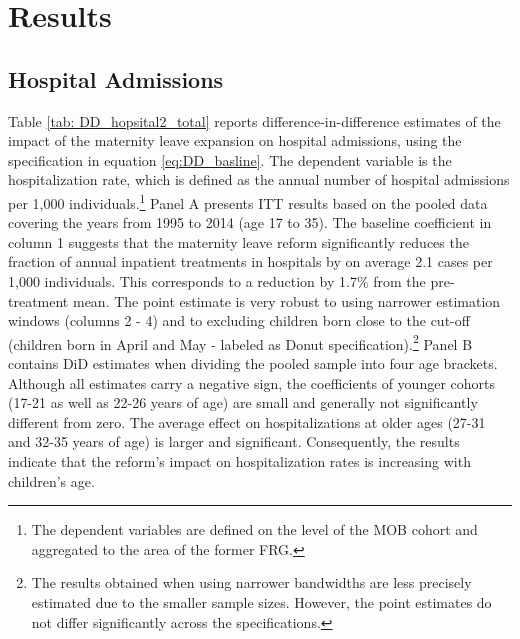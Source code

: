 \documentclass[11pt, a4paper,draft]{article} %
\begin{document}














\section{Results}\label{sec:results}

\subsection{Hospital Admissions}


Table \ref{tab: DD_hopsital2_total} reports difference-in-difference estimates of the impact of the maternity leave expansion on hospital admissions, using the specification in equation \ref{eq:DD_basline}. The dependent variable is the hospitalization rate, which is defined as the annual number of hospital admissions per 1,000 individuals.\footnote{The dependent variables are defined on the level of the MOB cohort and aggregated to the area of the former FRG.} Panel A presents ITT results based on the pooled data covering the years from 1995 to 2014 (age 17 to 35). The baseline coefficient in column 1 suggests that the maternity leave reform significantly reduces the fraction of annual inpatient treatments in hospitals by on average 2.1 cases per 1,000 individuals. This corresponds to a reduction by 1.7\% from the pre-treatment mean. The point estimate is very robust to using narrower estimation windows (columns 2 - 4) and to excluding children born close to the cut-off (children born in April and May - labeled as Donut specification).\footnote{The results obtained when using narrower bandwidths are less precisely estimated due to the smaller sample sizes. However, the point estimates do not differ significantly across the specifications.} Panel B contains DiD estimates when dividing the pooled sample into four age brackets. Although all estimates carry a negative sign, the coefficients of younger cohorts (17-21 as well as 22-26 years of age) are small and generally not significantly different from zero. The average effect on hospitalizations at older ages (27-31 and 32-35 years of age) is larger and significant. Consequently, the results indicate that the reform's impact on hospitalization rates is increasing with  children's age.
\end{document}
